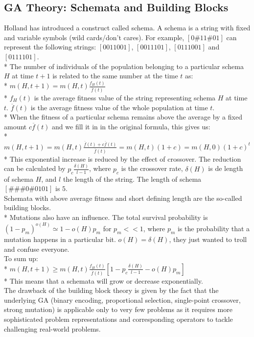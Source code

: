\documentclass[12pt]{article}
\begin{document}
\subsection{GA Theory: Schemata and Building Blocks}
Holland has introduced a construct called schema. A schema is a string with fixed and variable symbols (wild cards/don't cares). For example, $[0\#11\#01]$ can represent the following strings: $[0011001]$, $[0011101]$, $[0111001]$ and $[0111101]$.\\*
The number of individuals of the population belonging to a particular schema $H$ at time $t+1$ is related to the same number at the time $t$ as:\\*
$m(H,t+1) = m(H,t)\frac{f_H(t)}{\overline{f}(t)}$\\*
$f_H(t)$ is the average fitness value of the string representing schema $H$ at time $t$. $\overline{f}(t)$ is the average fitness value of the whole population at time $t$.\\*
When the fitness of a particular schema remains above the average by a fixed amount $c\overline{f}(t)$ and we fill it in in the original formula, this gives us:\\*
$m(H,t+1) = m(H,t)\frac{\overline{f}(t) + c\overline{f}(t)}{\overline{f}(t)} = m(H,t)(1 + c) = m(H,0)(1 + c)^t$\\*
This exponential increase is reduced by the effect of crossover. The reduction can be calculated by $p_c\frac{\delta(H)}{l-1}$, where $p_c$ is the crossover rate, $\delta(H)$ is de length of schema $H$, and $l$ the length of the string. The length of schema $[\#\#\#0\#0101]$ is $5$.\\
Schemata with above average fitness and short defining length are the so-called building blocks.\\*
Mutations also have an influence. The total survival probability is $(1-p_m)^{o(H)} \simeq 1-o(H)p_m$ for $p_m << 1$, where $p_m$ is the probability that a mutation happens in a particular bit. $o(H) = \delta(H)$, they just wanted to troll and confuse everyone.\\
To sum up:\\*
$m(H,t+1) \ge m(H,t)\frac{f_H(t)}{\overline{f}(t)}[1-p_c\frac{\delta(H)}{l-1}-o(H)p_m]$\\*
This means that a schemata will grow or decrease exponentially.\\
The drawback of the building block theory is given by the fact that the underlying GA (binary encoding, proportional selection, single-point crossover, strong mutation) is applicable only to very few problems as it requires more sophisticated problem representations and corresponding operators to tackle challenging real-world problems.
\end{document}
